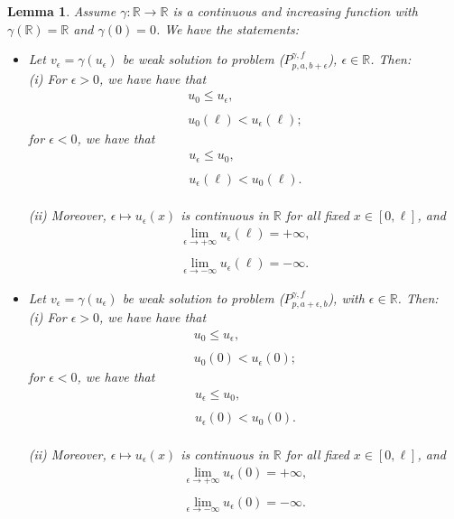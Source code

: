 \documentclass[10pt,a4paper]{amsart}
\newtheorem{lemma}{Lemma}
\begin{document}
  \begin{lemma}\label{lemma3} Assume $\gamma:\mathbb{R}\to \mathbb{R}$ is a continuous and increasing function with $\gamma(\mathbb{R})=\mathbb{R}$ and $\gamma(0)=0$. We have the  statements:
 \begin{itemize}
 \item[1.]  Let $v_\epsilon=\gamma(u_\epsilon)$ be weak solution to problem ($P_{p,a,b+\epsilon}^{\gamma,f}$),  $\epsilon \in \mathbb{R}$. Then:
\\ (i)  For $\epsilon>0$, we have have that
 $$\begin{array}{l}\displaystyle 
 u_0 \leq u_\epsilon,
 \\ \\
 \displaystyle u_0(\ell) <u_\epsilon(\ell);
\end{array} $$ 
  for $\epsilon<0$, we have that 
  $$\begin{array}{l}\displaystyle u_\epsilon\le u_0,
   \\ \\
 \displaystyle 
u_\epsilon(\ell)<u_0(\ell).
\end{array} $$ 
 \\ (ii) Moreover, $\epsilon\mapsto u_\epsilon(x)$ is continuous in $\mathbb{R}$ for all fixed $x\in[0,\ell]$, and 
\begin{equation}\label{ran001}
\begin{array}{l}
\displaystyle \lim_{\epsilon \to  +\infty} u_\epsilon(\ell) =  +\infty,
 \\ \\
\displaystyle \lim_{\epsilon \to  -\infty} u_\epsilon(\ell) =  -\infty.
\end{array} \end{equation}


  \item[2.] Let $v_\epsilon=\gamma(u_\epsilon)$ be weak solution to problem ($P_{p,a+\epsilon,b}^{\gamma,f}$), with $\epsilon \in \mathbb{R}$. Then:
  \\ (i)  For $\epsilon>0$, we have have that
 $$\begin{array}{l}\displaystyle 
 u_0 \leq u_\epsilon,
 \\ \\
 \displaystyle u_0(0) <u_\epsilon(0);
\end{array} $$ 
  for $\epsilon<0$, we have that 
  $$\begin{array}{l}\displaystyle u_\epsilon\le u_0,
   \\ \\
\displaystyle 
u_\epsilon(0)<u_0(0).
\end{array} $$ 
 \\ (ii) Moreover, $\epsilon\mapsto u_\epsilon(x)$ is continuous in $\mathbb{R}$ for all fixed $x\in[0,\ell]$, and 
\begin{equation}\label{ran001dos001}
\begin{array}{l}
\displaystyle \lim_{\epsilon \to  +\infty} u_\epsilon(0) =  +\infty,
 \\
\\
\displaystyle \lim_{\epsilon \to  -\infty} u_\epsilon(0) =  -\infty.
\end{array} \end{equation}


\end{itemize}
\end{lemma}
\end{document}
